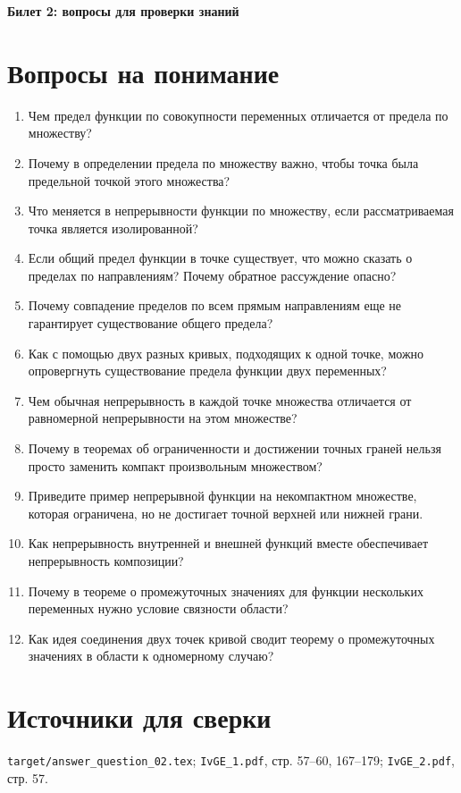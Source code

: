 \documentclass[12pt,a4paper]{article}
\begin{document}
\begin{center}
{\Large\bfseries Билет 2: вопросы для проверки знаний}
\end{center}

\noindent{}

\section*{Вопросы на понимание}

\begin{enumerate}
\item Чем предел функции по совокупности переменных отличается от предела по множеству?
\item Почему в определении предела по множеству важно, чтобы точка была предельной точкой этого множества?
\item Что меняется в непрерывности функции по множеству, если рассматриваемая точка является изолированной?
\item Если общий предел функции в точке существует, что можно сказать о пределах по направлениям? Почему обратное рассуждение опасно?
\item Почему совпадение пределов по всем прямым направлениям еще не гарантирует существование общего предела?
\item Как с помощью двух разных кривых, подходящих к одной точке, можно опровергнуть существование предела функции двух переменных?
\item Чем обычная непрерывность в каждой точке множества отличается от равномерной непрерывности на этом множестве?
\item Почему в теоремах об ограниченности и достижении точных граней нельзя просто заменить компакт произвольным множеством?
\item Приведите пример непрерывной функции на некомпактном множестве, которая ограничена, но не достигает точной верхней или нижней грани.
\item Как непрерывность внутренней и внешней функций вместе обеспечивает непрерывность композиции?
\item Почему в теореме о промежуточных значениях для функции нескольких переменных нужно условие связности области?
\item Как идея соединения двух точек кривой сводит теорему о промежуточных значениях в области к одномерному случаю?
\end{enumerate}

\section*{Источники для сверки}

\texttt{target/answer\_question\_02.tex};
\texttt{IvGE\_1.pdf}, стр. 57--60, 167--179;
\texttt{IvGE\_2.pdf}, стр. 57.
\end{document}
